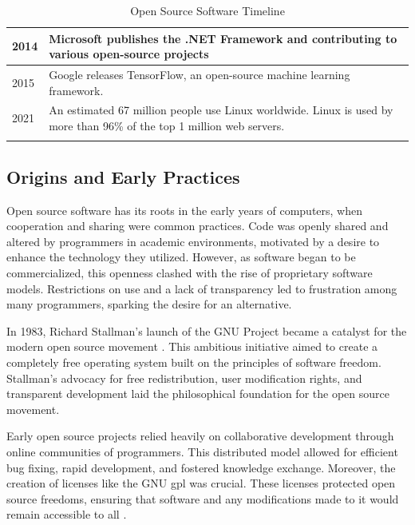 \begin{center}
\begin{longtable}{|p{1cm}|p{13cm}|}
        2014          & Microsoft publishes the .NET Framework and contributing to various open-source projects                                                                                                                \\ \hline
        2015          & Google releases TensorFlow, an open-source machine learning framework.                                                                                                                                 \\ \hline
        2021          & An estimated 67 million people use Linux worldwide. Linux is used by more than 96\% of the top 1 million web servers.                                                                                  \\ \hline

        \caption{Open Source Software Timeline \citep{17alexander2002working}}
        \label{tab:oss_timeline}
    \end{longtable}
\end{center}


\subsection{Origins and Early Practices}

Open source software has its roots in the early years of computers, when cooperation and sharing were common practices. Code was openly shared and altered by programmers in academic environments, motivated by a desire to enhance the technology they utilized. However, as software began to be commercialized, this openness clashed with the rise of proprietary software models. Restrictions on use and a lack of transparency led to frustration among many programmers, sparking the desire for an alternative.

In 1983, Richard Stallman's launch of the GNU Project became a catalyst for the modern open source movement \citep{dibona1999open}.  This ambitious initiative aimed to create a completely free operating system built on the principles of software freedom.  Stallman's advocacy for free redistribution, user modification rights, and transparent development laid the philosophical foundation for the open source movement.

Early open source projects relied heavily on collaborative development through online communities of programmers. This distributed model allowed for efficient bug fixing, rapid development, and fostered knowledge exchange.  Moreover, the creation of licenses like the GNU \ac{gpl} was crucial. These licenses protected open source freedoms, ensuring that software and any modifications made to it would remain accessible to all \citep{license1989gnu}.


